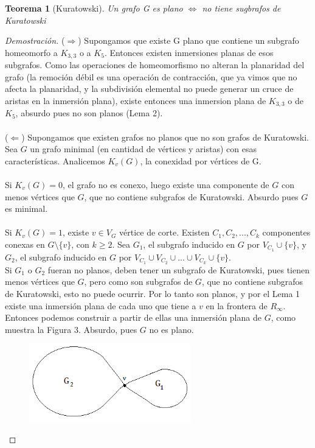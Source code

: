 \documentclass{article}
\newtheorem{theorem}{Teorema}
\begin{document}
\newpage
\begin{theorem}[Kuratowski]
Un grafo G es plano $\Leftrightarrow$ no tiene sugbrafos de Kuratowski
\end{theorem}
\begin{proof}[Demostración]
    ($\Longrightarrow$) Supongamos que existe G plano que contiene un subgrafo homeomorfo a $K_{3,3}$ o a $K_5$. Entonces existen inmersiones planas de esos subgrafos. Como las operaciones de homeomorfismo no alteran la planaridad del grafo (la remoción débil es una operación de contracción, que ya vimos que no afecta la planaridad, y la subdivisión elemental no puede generar un cruce de aristas en la inmersión plana), existe entonces una inmersion plana de $K_{3,3}$ o de $K_5$, absurdo pues no son planos (Lema 2).
\\\\
    ($\Longleftarrow$) Supongamos que existen grafos no planos que no son grafos de Kuratowski. Sea $G$ un grafo minimal (en cantidad de vértices y aristas) con esas características.
    Analicemos $K_v(G)$, la conexidad por vértices de G.\\\\
    Si $K_v(G) = 0$, el grafo no es conexo, luego existe una componente de $G$ con menos vértices que $G$, que no contiene subgrafos de Kuratowski. Absurdo pues $G$ es minimal.\\\\
    Si $K_v(G) = 1$, existe $v \in V_G$ vértice de corte. Existen $C_1, C_2, ..., C_k$ componentes conexas en $G\setminus\{v\}$, con $k \ge 2$. Sea $G_1$, el subgrafo inducido en $G$ por $V_{C_1} \cup \{v\}$, y $G_2$, el subgrafo inducido en $G$ por $V_{C_1} \cup V_{C_2} \cup ... \cup V_{C_k} \cup \{v\}$. \\
    Si $G_1$ o $G_2$ fueran no planos, deben tener un subgrafo de Kuratowski, pues tienen menos vértices que $G$, pero como son subgrafos de $G$, que no contiene subgrafos de Kuratowski, esto no puede ocurrir. Por lo tanto son planos, y por el Lema 1 existe una inmersión plana de cada uno que tiene a $v$ en la frontera de $R_\infty$. Entonces podemos construir a partir de ellas una inmersión plana de $G$, como muestra la Figura 3. Absurdo, pues $G$ no es plano. \\ 
\begin{figure}[htp]
\centering
\includegraphics[width=7cm]{img/kura3}

\end{figure}
\end{proof}
\end{document}
